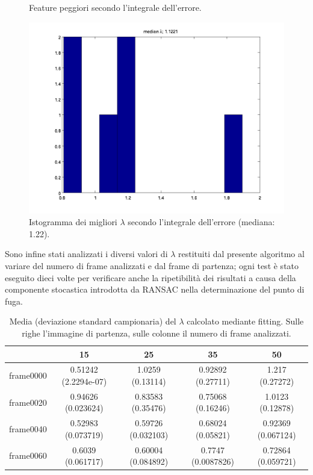 \documentclass[12pt]{report}
\begin{document}
\begin{figure}[H]
\begin{minipage}[t]{0.5\linewidth}
\end{minipage}
\caption[short]{Feature peggiori secondo l'integrale dell'errore.}
\label{fig:worstIntErr}
\end{figure}


\begin{figure}[H]
	\centering
	\includegraphics[scale=.5]{images/intErrhistLamFit}
	\caption{Istogramma dei migliori $\lambda$ secondo l'integrale dell'errore (mediana: 1.22).}
	\label{fig:intErrHist}
\end{figure}

\noindent Sono infine stati analizzati i diversi valori di $\lambda$ restituiti dal presente algoritmo al variare del numero di frame analizzati e dal frame di partenza; ogni test \`e stato eseguito dieci volte per verificare anche la ripetibilit\`a dei risultati a causa della componente stocastica introdotta da RANSAC nella determinazione del punto di fuga.\\

\begin{table}[H]
\begin{center}
\begin{tabular}{|c|c|c|c|c|}
	\hline
	& 15 & 25 & 35 & 50 \\
	\hline
	frame0000 & 0.51242 (2.2294e-07) & 1.0259 (0.13114) & 0.92892 (0.27711) & 1.217 (0.27272)\\ \hline
	frame0020 & 0.94626 (0.023624) & 0.83583 (0.35476) & 0.75068 (0.16246) & 1.0123 (0.12878)\\ \hline
	frame0040 & 0.52983 (0.073719) & 0.59726 (0.032103) & 0.68024 (0.05821) & 0.92369 (0.067124)\\ \hline
	frame0060 & 0.6039 (0.061717) & 0.60004 (0.084892) & 0.7747 (0.0087826) & 0.72864 (0.059721)\\ \hline
\end{tabular}
\caption{Media (deviazione standard campionaria) del $\lambda$ calcolato mediante fitting. Sulle righe l'immagine di partenza, sulle colonne il numero di frame analizzati.}
\label{tabFit}
\end{center}
\end{table}
\end{document}

